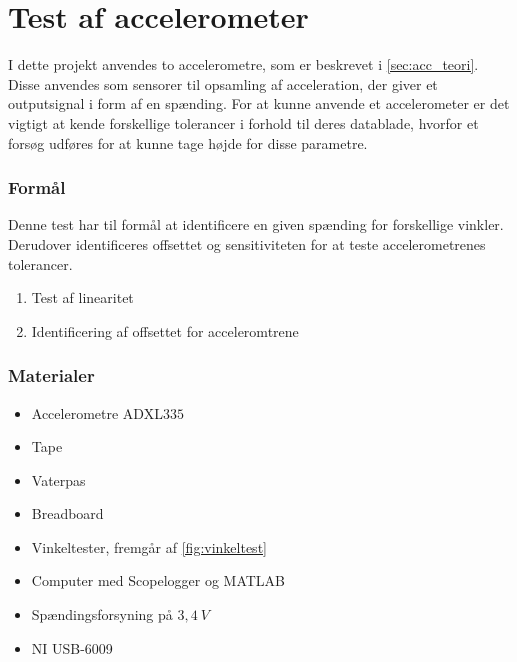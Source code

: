 \chapter{Test af accelerometer} 
\label{sec:test_acc}
I dette projekt anvendes to accelerometre, som er beskrevet i \autoref{sec:acc_teori}. Disse anvendes som sensorer til opsamling af acceleration, der giver et outputsignal i form af en spænding. For at kunne anvende et accelerometer er det vigtigt at kende forskellige tolerancer i forhold til deres datablade, hvorfor et forsøg udføres for at kunne tage højde for disse parametre.

\subsection{Formål}\label{sec:acc_formaal}
Denne test har til formål at identificere en given spænding for forskellige vinkler. Derudover identificeres %
offsettet og sensitiviteten for at teste accelerometrenes tolerancer.

\begin{enumerate}
\item Test af linearitet
\item Identificering af offsettet for acceleromtrene %
\end{enumerate}

\subsection{Materialer}
\begin{itemize}
\item Accelerometre ADXL$335$
\item Tape
\item Vaterpas
\item Breadboard
\item Vinkeltester, fremgår af \autoref{fig:vinkeltest}
\item Computer med Scopelogger og MATLAB
\item Spændingsforsyning på $3,4~V$ 
\item NI USB-6009
\end{itemize}

